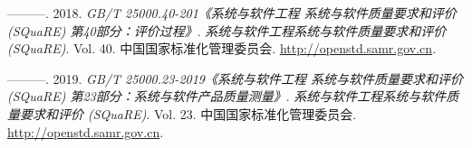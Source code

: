 \documentclass[hyperref, a4paper]{ctexart}
\begin{document}
\leavevmode\hypertarget{ref-innovative5}{}%
---------. 2018. \emph{GB/T 25000.40-201《系统与软件工程
系统与软件质量要求和评价(SQuaRE) 第40部分：评价过程》}.
\emph{系统与软件工程系统与软件质量要求和评价 (SQuaRE)}. Vol. 40.
中国国家标准化管理委员会. \url{http://openstd.samr.gov.cn}.

\leavevmode\hypertarget{ref-innovative2}{}%
---------. 2019. \emph{GB/T 25000.23-2019《系统与软件工程
系统与软件质量要求和评价(SQuaRE) 第23部分：系统与软件产品质量测量》}.
\emph{系统与软件工程系统与软件质量要求和评价 (SQuaRE)}. Vol. 23.
中国国家标准化管理委员会. \url{http://openstd.samr.gov.cn}.
\end{document}
